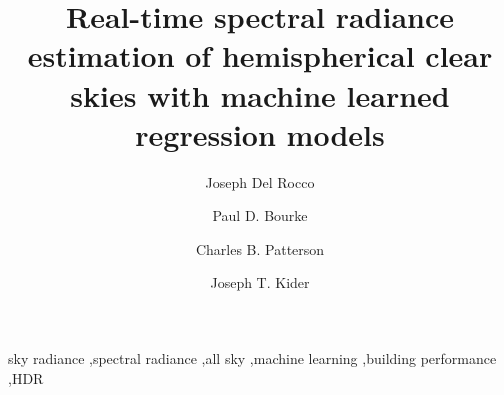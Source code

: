 \documentclass[a4paper,fleqn]{cas-sc}
\begin{document}
\title [mode = title]{Real-time spectral radiance estimation of hemispherical clear skies with machine learned regression models}

\author[1]{{Joseph} {Del Rocco}}
\cormark[1]
\author[2]{Paul D. Bourke}
\author[3]{Charles B. Patterson}
\author[1]{Joseph T. Kider}
\address[1]{IST, School of Modeling, Simulation, \& Training, University of Central Florida, Orlando, FL, USA}
\address[2]{University of Western Australia, Crawley WA, Australia}
\address[3]{Full Sail University, Winter Park, FL, USA}






\begin{keywords}
sky radiance \sep spectral radiance \sep all sky \sep machine learning \sep building performance \sep HDR
\end{keywords}

\maketitle
\end{document}
